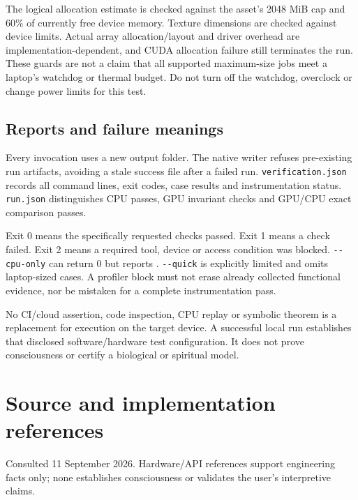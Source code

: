 \documentclass[11pt,a4paper]{article}
\begin{document}
The logical allocation estimate is checked against the asset's 2048 MiB cap and 60\% of currently free device memory. Texture dimensions are checked against device limits. Actual array allocation/layout and driver overhead are implementation-dependent, and CUDA allocation failure still terminates the run. These guards are not a claim that all supported maximum-size jobs meet a laptop's watchdog or thermal budget. Do not turn off the watchdog, overclock or change power limits for this test.

\subsection{Reports and failure meanings}\label{reports-and-failure-meanings}

Every invocation uses a new output folder. The native writer refuses pre-existing run artifacts, avoiding a stale success file after a failed run. \texttt{verification.json} records all command lines, exit codes, case results and instrumentation status. \texttt{run.json} distinguishes CPU passes, GPU invariant checks and GPU/CPU exact comparison passes.

Exit 0 means the specifically requested checks passed. Exit 1 means a check failed. Exit 2 means a required tool, device or access condition was blocked. \texttt{-\/-cpu-only} can return 0 but reports . \texttt{-\/-quick} is explicitly limited and omits laptop-sized cases. A profiler block must not erase already collected functional evidence, nor be mistaken for a complete instrumentation pass.

No CI/cloud assertion, code inspection, CPU replay or symbolic theorem is a replacement for execution on the target device. A successful local run establishes that disclosed software/hardware test configuration. It does not prove consciousness or certify a biological or spiritual model.

\clearpage

\begingroup\small

\section{Source and implementation references}\label{source-and-implementation-references}

Consulted 11 September 2026. Hardware/API references support engineering facts only; none establishes consciousness or validates the user's interpretive claims.
\end{document}
